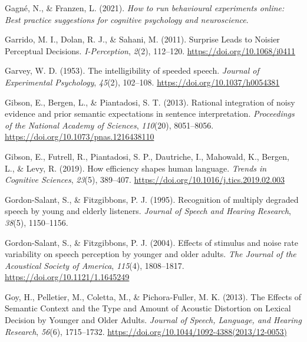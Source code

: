 \documentclass[a4paper, nobind]{templates/ociamthesis}
\newlength{\cslhangindent}
\newenvironment{CSLReferences}[2] %
 {%
  \setlength{\parindent}{0pt}
  \ifodd #1
  \let\oldpar\par
  \def\par{\hangindent=\cslhangindent\oldpar}
  \fi
  \setlength{\parskip}{1mm}
  \setlength{\baselineskip}{6mm}
 }%
 {}
\begin{document}
\begin{CSLReferences}{1}{0}
\leavevmode{}%
Gagné, N., \& Franzen, L. (2021). \emph{How to run behavioural experiments online: Best practice suggestions for cognitive psychology and neuroscience}.

\leavevmode{}%
Garrido, M. I., Dolan, R. J., \& Sahani, M. (2011). Surprise Leads to Noisier Perceptual Decisions. \emph{I-Perception}, \emph{2}(2), 112--120. \url{https://doi.org/10.1068/i0411}

\leavevmode{}%
Garvey, W. D. (1953). {The intelligibility of speeded speech}. \emph{Journal of Experimental Psychology}, \emph{45}(2), 102--108. \url{https://doi.org/10.1037/h0054381}

\leavevmode{}%
Gibson, E., Bergen, L., \& Piantadosi, S. T. (2013). Rational integration of noisy evidence and prior semantic expectations in sentence interpretation. \emph{Proceedings of the National Academy of Sciences}, \emph{110}(20), 8051--8056. \url{https://doi.org/10.1073/pnas.1216438110}

\leavevmode{}%
Gibson, E., Futrell, R., Piantadosi, S. P., Dautriche, I., Mahowald, K., Bergen, L., \& Levy, R. (2019). How efficiency shapes human language. \emph{Trends in Cognitive Sciences}, \emph{23}(5), 389--407. \url{https://doi.org/10.1016/j.tics.2019.02.003}

\leavevmode{}%
Gordon-Salant, S., \& Fitzgibbons, P. J. (1995). {Recognition of multiply degraded speech by young and elderly listeners}. \emph{Journal of Speech and Hearing Research}, \emph{38}(5), 1150--1156.

\leavevmode{}%
Gordon-Salant, S., \& Fitzgibbons, P. J. (2004). {Effects of stimulus and noise rate variability on speech perception by younger and older adults}. \emph{The Journal of the Acoustical Society of America}, \emph{115}(4), 1808--1817. \url{https://doi.org/10.1121/1.1645249}

\leavevmode{}%
Goy, H., Pelletier, M., Coletta, M., \& Pichora-Fuller, M. K. (2013). {The Effects of Semantic Context and the Type and Amount of Acoustic Distortion on Lexical Decision by Younger and Older Adults}. \emph{Journal of Speech, Language, and Hearing Research}, \emph{56}(6), 1715--1732. \url{https://doi.org/10.1044/1092-4388(2013/12-0053)}


\end{CSLReferences}
\end{document}

